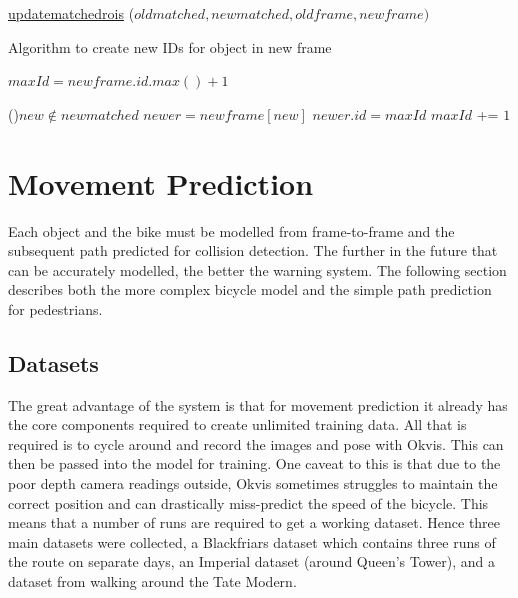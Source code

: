 \documentclass[11pt,twoside]{report}
\begin{document}
\begin{algorithm}[H]
	\DontPrintSemicolon
	\SetAlgoLined
	\underline{update\textunderscore matched\textunderscore rois} ($old$\textunderscore$matched,new$\textunderscore$matched,old$\textunderscore$frame,new$\textunderscore$frame)$\;
	\texttt{\\}
	\caption{Algorithm to create new IDs for object in new frame}
	\label{alg:weights}
\end{algorithm}

\newpage

$maxId = new$\textunderscore$frame.id.max()+1$ 

\ForEach(){$new \notin new$\textunderscore$matched$}{
$newer = new$\textunderscore$frame[new]$ 
$newer.id = maxId$ 
$maxId$ += $1$ 
}


\section{Movement Prediction}

Each object and the bike must be modelled from frame-to-frame and the subsequent path predicted for collision detection. The further in the future that can be accurately modelled, the better the warning system. The following section describes both the more complex bicycle model and the simple path prediction for pedestrians.


\subsection{Datasets}
The great advantage of the system is that for movement prediction it already has the core components required to create unlimited training data. All that is required is to cycle around and record the images and pose with Okvis. This can then be passed into the model for training. One caveat to this is that due to the poor depth camera readings outside, Okvis sometimes struggles to maintain the correct position and can drastically miss-predict the speed of the bicycle. This means that a number of runs are required to get a working dataset. Hence three main datasets were collected, a Blackfriars dataset which contains three runs of the route on separate days, an Imperial dataset (around Queen's Tower), and a dataset from walking around the Tate Modern.
\end{document}

